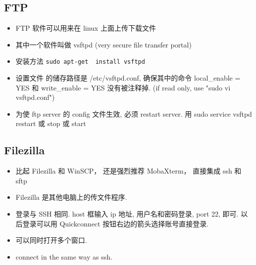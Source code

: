 
\subsection{FTP}
\begin{itemize}
\item FTP 软件可以用来在 linux 上面上传下载文件
\item 其中一个软件叫做 vsftpd (very secure file transfer portal)
\item 安装方法 \verb`sudo apt-get  install vsftpd`
\item 设置文件 的储存路径是 /etc/vsftpd.conf, 确保其中的命令 local_enable = YES 和 write_enable = YES  没有被注释掉.
(if read only, use "sudo vi vsftpd.conf")
\item 为使 ftp server 的 config 文件生效, 必须 restart server. 用 sudo service vsftpd restart 或 stop 或 start
\end{itemize}

\subsection{Filezilla}
\begin{itemize}
\item 比起 Filezilla 和 WinSCP， 还是强烈推荐 MobaXterm， 直接集成 ssh 和 sftp
\item Filezilla 是其他电脑上的传文件程序.
\item 登录与 SSH 相同. host 框输入 ip 地址, 用户名和密码登录, port 22, 即可. 以后登录可以用 Quickconnect 按钮右边的箭头选择账号直接登录.
\item 可以同时打开多个窗口.
\item connect in the same way as ssh.
\end{itemize}

